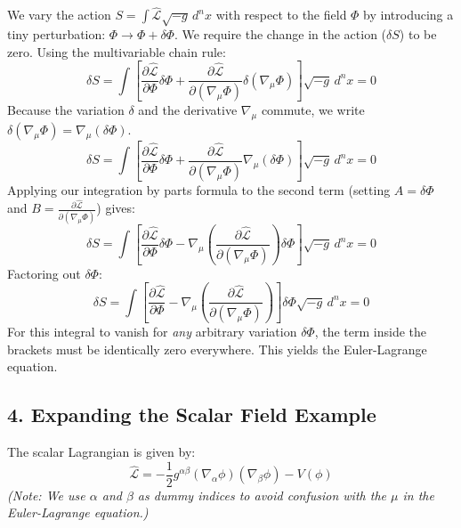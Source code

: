 \documentclass[11pt, a4paper]{report}
\begin{document}
We vary the action $S = \int \hat{\mathcal{L}} \sqrt{-g} \, d^n x$ with respect to the field $\Phi$ by introducing a tiny perturbation: $\Phi \rightarrow \Phi + \delta \Phi$. We require the change in the action ($\delta S$) to be zero. Using the multivariable chain rule:
\begin{equation}
    \delta S = \int \left[ \frac{\partial \hat{\mathcal{L}}}{\partial \Phi} \delta \Phi + \frac{\partial \hat{\mathcal{L}}}{\partial (\nabla_\mu \Phi)} \delta (\nabla_\mu \Phi) \right] \sqrt{-g} \, d^n x = 0
\end{equation}
Because the variation $\delta$ and the derivative $\nabla_\mu$ commute, we write $\delta (\nabla_\mu \Phi) = \nabla_\mu (\delta \Phi)$.
\begin{equation}
    \delta S = \int \left[ \frac{\partial \hat{\mathcal{L}}}{\partial \Phi} \delta \Phi + \frac{\partial \hat{\mathcal{L}}}{\partial (\nabla_\mu \Phi)} \nabla_\mu (\delta \Phi) \right] \sqrt{-g} \, d^n x = 0
\end{equation}
Applying our integration by parts formula to the second term (setting $A = \delta \Phi$ and $B = \frac{\partial \hat{\mathcal{L}}}{\partial (\nabla_\mu \Phi)}$) gives:
\begin{equation}
    \delta S = \int \left[ \frac{\partial \hat{\mathcal{L}}}{\partial \Phi} \delta \Phi - \nabla_\mu \left( \frac{\partial \hat{\mathcal{L}}}{\partial (\nabla_\mu \Phi)} \right) \delta \Phi \right] \sqrt{-g} \, d^n x = 0
\end{equation}
Factoring out $\delta \Phi$:
\begin{equation}
    \delta S = \int \left[ \frac{\partial \hat{\mathcal{L}}}{\partial \Phi} - \nabla_\mu \left( \frac{\partial \hat{\mathcal{L}}}{\partial (\nabla_\mu \Phi)} \right) \right] \delta \Phi \sqrt{-g} \, d^n x = 0
\end{equation}
For this integral to vanish for \textit{any} arbitrary variation $\delta \Phi$, the term inside the brackets must be identically zero everywhere. This yields the Euler-Lagrange equation.

\subsection*{4. Expanding the Scalar Field Example}

The scalar Lagrangian is given by:
\begin{equation}
    \hat{\mathcal{L}} = -\frac{1}{2} g^{\alpha\beta} (\nabla_\alpha \phi) (\nabla_\beta \phi) - V(\phi)
\end{equation}
\textit{(Note: We use $\alpha$ and $\beta$ as dummy indices to avoid confusion with the $\mu$ in the Euler-Lagrange equation.)}
\end{document}
